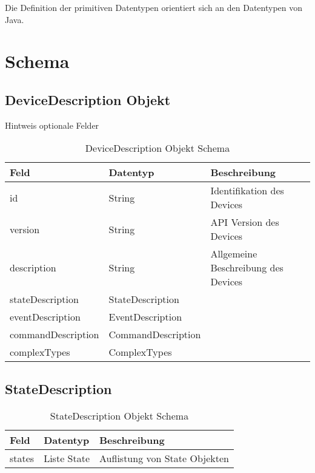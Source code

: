 Die Definition der primitiven Datentypen orientiert sich an den Datentypen von Java.

\section{Schema}

\subsection{DeviceDescription Objekt}

Hintweis optionale Felder

\begin{table}[H]
\begin{tabularx}{\textwidth}{|l|l|X|}

 \hline
 {\bf Feld } & {\bf Datentyp } & {\bf Beschreibung } \\  \hline

 id  &   String   & Identifikation des Devices   \\ \hline

 version & String & API Version des Devices \\ \hline

 description & String & Allgemeine Beschreibung des Devices \\ \hline 
 
 stateDescription  &   StateDescription    &     \\ \hline
 
 eventDescription  &   EventDescription    &     \\ \hline
  
 commandDescription  &   CommandDescription    &     \\ \hline
 
 complexTypes  &   ComplexTypes    &     \\ \hline
 
\end{tabularx}
\caption{DeviceDescription Objekt Schema}
\end{table}

\subsection{StateDescription}
\begin{table}[H]
\begin{tabularx}{\textwidth}{|l|l|X|}

 \hline
 {\bf Feld } & {\bf Datentyp } & {\bf Beschreibung } \\  \hline

 states  &   Liste State   & Auflistung von State Objekten   \\ \hline

\end{tabularx}
\caption{StateDescription Objekt Schema}
\end{table}

